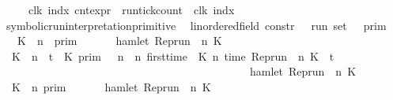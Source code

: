 \begin{isabellebody}
{\isacharbar}\ {\isacartoucheopen}{\isasymlbrakk}\ {\isasymrho}\ {\isasymturnstile}\ {\isacharhash}\isactrlsup {\isasymle}\ clk\ indx\ {\isasymrbrakk}\isactrlsub c\isactrlsub n\isactrlsub t\isactrlsub e\isactrlsub x\isactrlsub p\isactrlsub r\ {\isacharequal}\ run{\isacharunderscore}tick{\isacharunderscore}count\ {\isasymrho}\ clk\ indx{\isacartoucheclose}\isanewline
\isanewline
\isanewline
{}\isamarkupfalse%
\ symbolic{\isacharunderscore}run{\isacharunderscore}interpretation{\isacharunderscore}primitive\isanewline
\ \ {\isacharcolon}{\isacharcolon}{\isacartoucheopen}{\isacharparenleft}{\isacharprime}{\isasymtau}{\isacharcolon}{\isacharcolon}linordered{\isacharunderscore}field{\isacharparenright}\ constr\ {\isasymRightarrow}\ {\isacharprime}{\isasymtau}\ run\ set{\isacartoucheclose}\ {\isacharparenleft}{\isachardoublequoteopen}{\isasymlbrakk}\ {\isacharunderscore}\ {\isasymrbrakk}\isactrlsub p\isactrlsub r\isactrlsub i\isactrlsub m{\isachardoublequoteclose}{\isacharparenright}\isanewline
{}\isanewline
\ \ {\isacartoucheopen}{\isasymlbrakk}\ K\ {\isasymUp}\ n\ \ {\isasymrbrakk}\isactrlsub p\isactrlsub r\isactrlsub i\isactrlsub m\ \ \ \ \ {\isacharequal}\ {\isacharbraceleft}{\isasymrho}{\isachardot}\ hamlet\ {\isacharparenleft}{\isacharparenleft}Rep{\isacharunderscore}run\ {\isasymrho}{\isacharparenright}\ n\ K{\isacharparenright}\ {\isacharbraceright}{\isacartoucheclose}\isanewline
{\isacharbar}\ {\isacartoucheopen}{\isasymlbrakk}\ K\ {\isacharat}\ n\ {\isasymoplus}\ {\isasymdelta}t\ {\isasymRightarrow}\ K{\isacharprime}\ {\isasymrbrakk}\isactrlsub p\isactrlsub r\isactrlsub i\isactrlsub m\ {\isacharequal}\ {\isacharbraceleft}{\isasymrho}{\isachardot}\ {\isasymforall}n\ {\isasymge}\ n\ first{\isacharunderscore}time\ {\isasymrho}\ K\ n\ {\isacharparenleft}time\ {\isacharparenleft}{\isacharparenleft}Rep{\isacharunderscore}run\ {\isasymrho}{\isacharparenright}\ n\ K{\isacharparenright}\ {\isacharplus}\ {\isasymdelta}t{\isacharparenright}\isanewline
\ \ \ \ \ \ \ \ \ \ \ \ \ \ \ \ \ \ \ \ \ \ \ \ \ \ \ \ \ \ \ \ \ \ \ \ \ \ \ \ \ \ \ \ {\isasymlongrightarrow}\ hamlet\ {\isacharparenleft}{\isacharparenleft}Rep{\isacharunderscore}run\ {\isasymrho}{\isacharparenright}\ n\ K{\isacharprime}{\isacharparenright}{\isacharbraceright}{\isacartoucheclose}\isanewline
{\isacharbar}\ {\isacartoucheopen}{\isasymlbrakk}\ K\ {\isasymnot}{\isasymUp}\ n\ {\isasymrbrakk}\isactrlsub p\isactrlsub r\isactrlsub i\isactrlsub m\ \ \ \ \ {\isacharequal}\ {\isacharbraceleft}{\isasymrho}{\isachardot}\ {\isasymnot}hamlet\ {\isacharparenleft}{\isacharparenleft}Rep{\isacharunderscore}run\ {\isasymrho}{\isacharparenright}\ n\ K{\isacharparenright}\ {\isacharbraceright}{\isacartoucheclose}\isanewline

\end{isabellebody}
